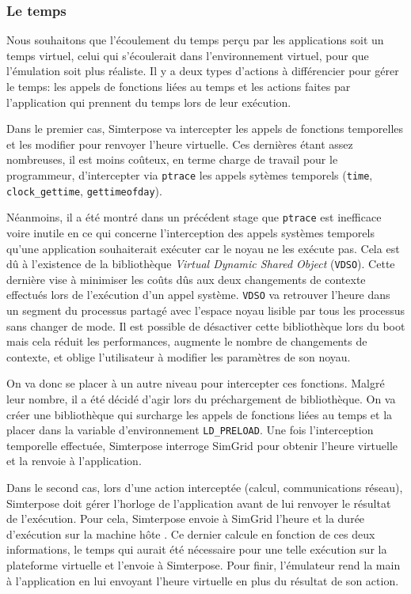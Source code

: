 \subsubsection{Le temps}

Nous souhaitons que l'écoulement du temps perçu par les applications soit un
temps virtuel, celui qui s'écoulerait dans l'environnement virtuel, pour que
l'émulation soit plus réaliste. Il y a deux types d'actions à différencier pour
gérer le temps: les appels de fonctions liées au temps et les actions faites par
l'application qui prennent du temps lors de leur exécution.

Dans le premier cas, Simterpose va intercepter les appels de fonctions
temporelles et les modifier pour renvoyer l'heure virtuelle. Ces dernières étant
assez nombreuses, il est moins coûteux, en terme charge de travail pour
le programmeur, d'intercepter via
\texttt{ptrace} les appels sytèmes temporels (\texttt{time},
\texttt{clock\_gettime}, \texttt{gettimeofday}).

Néanmoins, il a été montré dans un précédent stage
\citep{CHLOE:Emulationapplicationdistribuees} que \texttt{ptrace} est inefficace
voire inutile en ce qui concerne l'interception des appels systèmes temporels
qu'une application souhaiterait exécuter car le noyau ne les exécute pas. Cela
est dû à l'existence de la bibliothèque \textit{Virtual Dynamic Shared Object}
(\texttt{VDSO}). Cette dernière vise à minimiser les coûts dûs aux deux changements de contexte effectués lors de l'exécution d'un appel système. \texttt{VDSO} va retrouver l'heure dans un segment du processus partagé avec l'espace noyau lisible par tous les processus sans changer de mode. Il est possible de désactiver cette bibliothèque lors du boot mais cela réduit les performances, augmente le nombre de changements de contexte, et oblige l'utilisateur à modifier les paramètres de son noyau.

On va donc se placer à un autre niveau pour intercepter ces fonctions. Malgré
leur nombre, il a été décidé d'agir lors du préchargement de bibliothèque. On va
créer une bibliothèque qui surcharge les appels de fonctions liées au temps et
la placer dans la variable d'environnement \texttt{LD\_PRELOAD}. Une fois l'interception temporelle effectuée,
Simterpose interroge SimGrid pour obtenir l'heure virtuelle et la renvoie à
l'application.

Dans le second cas, lors d'une action interceptée (calcul, communications
réseau), Simterpose doit gérer l'horloge de l'application avant de lui renvoyer
le résultat de l'exécution. Pour cela, Simterpose envoie à SimGrid l'heure et la
durée d'exécution sur la machine hôte . Ce dernier calcule en fonction de ces
deux informations, le temps qui aurait été nécessaire pour une telle exécution
sur la plateforme virtuelle et l'envoie à Simterpose. Pour finir, l'émulateur
rend la main à l'application en lui envoyant l'heure virtuelle en plus du
résultat de son action.
